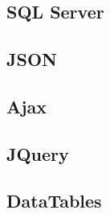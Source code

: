\section{}
\subsection{SQL Server}
\subsection{JSON}
\subsection{Ajax}
\subsection{JQuery}
\subsection{DataTables}

